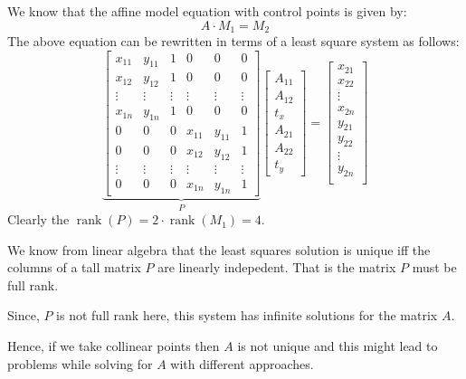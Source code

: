 \documentclass[a4paper]{article}
\begin{document}
We know that the affine model equation with control points is given by:
\begin{equation}
	A\cdot M_1 = M_2%
\end{equation}
The above equation can be rewritten in terms of a least square system as follows:
\begin{equation}
	\underbrace{
	\begin{bmatrix}
		x_{11} & y_{11} & 1 & 0 & 0 & 0\\
		x_{12} & y_{12} & 1 & 0 & 0 & 0\\
		\vdots & \vdots & \vdots & \vdots & \vdots & \vdots \\
		x_{1n} & y_{1n} & 1 & 0 & 0 & 0\\
		0 & 0 & 0 & x_{11} & y_{11} & 1\\
		0 & 0 & 0 & x_{12} & y_{12} & 1\\
		\vdots & \vdots & \vdots & \vdots & \vdots & \vdots \\
		0 & 0 & 0 & x_{1n} & y_{1n} & 1
	\end{bmatrix}}_{P}
	\begin{bmatrix}
		A_{11}\\A_{12}\\t_x\\A_{21}\\A_{22}\\t_y
	\end{bmatrix}
	=
	\begin{bmatrix}
		x_{21}\\
		x_{22}\\
		\vdots\\
		x_{2n}\\
		y_{21}\\
		y_{22}\\
		\vdots\\
		y_{2n}\\
	\end{bmatrix}
\end{equation}
Clearly the $\operatorname{rank}(P)=2\cdot\operatorname{rank}(M_1)=4$.

We know from linear algebra that the least squares solution is unique iff the columns of a tall matrix $P$ are linearly indepedent. That is the matrix $P$ must be full rank. 

Since, $P$ is not full rank here, this system has infinite solutions for the matrix $A$. 

Hence, if we take collinear points then $A$ is not unique and this might lead to problems while solving for $A$ with different approaches.
\end{document}
